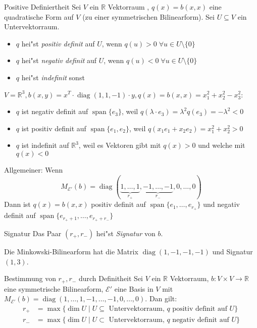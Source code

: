 \documentclass[oneside,fontsize=11pt,paper=a4,BCOR=0mm,DIV=12,automark,headsepline]{scrbook}
\DeclareMathOperator{\mDiag}{diag}
\DeclareMathOperator{\spn}{span}
\theoremstyle{remark}
\theoremstyle{definition}
\theoremstyle{definition}
\theoremstyle{remark}
\begin{document}
\begin{definition}{Positive Definiertheit}{}
  Sei $V$ ein $\mathbb{R}$ Vektorraum , $q(x)=b(x,x)$ eine quadratische Form auf
  \(V\) (zu einer symmetrischen Bilinearform). Sei $U\subseteq V$ ein Untervektorraum.
  \begin{itemize}
  \item $q$ hei"st \emph{positiv definit} auf $U$, wenn $q(u) > 0\; \forall
    u\in U\setminus\{0\}$
  \item $q$ hei"st \emph{negativ definit} auf $U$, wenn $q(u) < 0\; \forall
    u\in U\setminus\{0\}$
  \item $q$ hei"st \emph{indefinit} sonst
  \end{itemize}
\end{definition}
\begin{exa}
  \(V = \mathbb{R}^3, b(x, y) = x^T\cdot\mDiag (1, 1, -1)\cdot y, q(x) = b(x,x) = x_1^2 + x_2^2 - x_3^2\):
  \begin{itemize}
  \item \(q\) ist negativ definit auf \(\spn \{e_3\}\), weil \(q(\lambda\cdot e_3) = \lambda^2q(e_3) = -\lambda^2 < 0\)
  \item \(q\) ist positiv definit auf \(\spn \{e_1, e_2\}\), weil \(q(x_1e_1 + x_2e_2) = x_1^2 + x_2^2 > 0\)
  \item \(q\) ist indefinit auf \(\mathbb{R}^3\), weil es Vektoren gibt mit \(q(x) > 0\) und welche mit \(q(x) < 0\)
  \end{itemize}
\end{exa}
\begin{relation}
  Allgemeiner: Wenn \[M_{\mathcal{E}'}(b) = \mDiag (\underbrace{1,\dots,1}_{r_+},\underbrace{-1,\dots,-1}_{r_-},0,\dots,0)\] Dann ist \(q(x) = b(x,x)\) positiv definit auf \(\spn\{e_1,\dots,e_{r_+}\}\) und negativ definit auf \(\spn\{e_{r_++1},\dots,e_{r_++r_-}\}\)
\end{relation}
\begin{definition}{Signatur}{}
  Das Paar \((r_+,r_-)\) hei"st \emph{Signatur} von \(b\).
\end{definition}
\begin{exa}
  Die Minkowski-Bilinearform hat die Matrix \(\mDiag (1, -1, -1, -1)\) und Signatur \((1, 3)\).
\end{exa}
\begin{satz}{Bestimmung von $r_+, r_-$ durch Definitheit}
  Sei $V$ ein $\mathbb{R}$ Vektorraum, $b: V\times V \to \mathbb{R}$ eine symmetrische Bilinearform, \(\mathcal{E}'\) eine Basis in \(V\) mit \(M_{\mathcal{E}'}(b) = \mDiag (1,\dots,1,-1,\dots,-1,0,\dots,0)\).
  Dan gilt:
  \begin{align*}
    r_+&=\max\{\dim U\mid U\subseteq\text{ Untervektorraum, } q \text{ positiv definit auf } U\} \\
    r_-&=\max\{\dim U\mid U\subset \text{ Untervektorraum, }q\text{ negativ definit auf } U\}
  \end{align*}
\end{satz}
\end{document}
